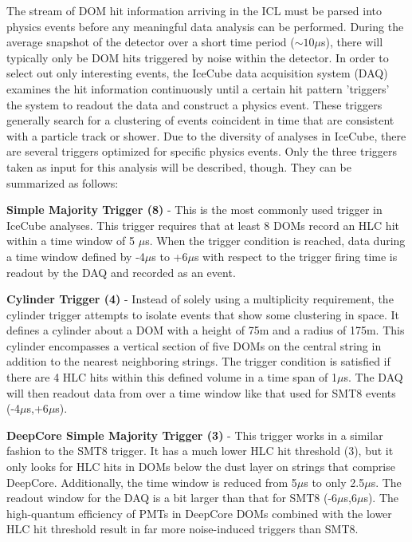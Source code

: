 \documentclass{gatech-thesis}
\begin{document}
The stream of DOM hit information arriving in the ICL must be parsed into physics events before any meaningful data analysis can be performed. During the average snapshot of the detector over a short time period ($\sim 10 \mu$s), there will typically only be DOM hits triggered by noise within the detector. In order to select out only interesting events, the IceCube data acquisition system (DAQ) examines the hit information continuously until a certain hit pattern 'triggers' the system to readout the data and construct a physics event. These triggers generally search for a clustering of events coincident in time that are consistent with a particle track or shower. Due to the diversity of analyses in IceCube, there are several triggers optimized for specific physics events. Only the three triggers taken as input for this analysis will be described, though. They can be summarized as follows:

\begin{adjustwidth}{2.5em}{2.5em}
\setlength{\parindent}{0pt}
\textbf{Simple Majority Trigger (8)} - This is the most commonly used trigger in IceCube analyses. This trigger requires that at least 8 DOMs record an HLC hit within a time window of 5 $\mu$s. When the trigger condition is reached, data during a time window defined by -4$\mu$s to +6$\mu$s with respect to the trigger firing time is readout by the DAQ and recorded as an event.

\textbf{Cylinder Trigger (4)} - Instead of solely using a multiplicity requirement, the cylinder trigger attempts to isolate events that show some clustering in space. It defines a cylinder about a DOM with a height of 75m and a radius of 175m. This cylinder encompasses a vertical section of five DOMs on the central string in addition to the nearest neighboring strings. The trigger condition is satisfied if there are 4 HLC hits within this defined volume in a time span of 1$\mu$s. The DAQ will then readout data from over a time window like that used for SMT8 events (-4$\mu$s,+6$\mu$s).

\textbf{DeepCore Simple Majority Trigger (3)} - This trigger works in a similar fashion to the SMT8 trigger. It has a much lower HLC hit threshold (3), but it only looks for HLC hits in DOMs below the dust layer on strings that comprise DeepCore. Additionally, the time window is reduced from 5$\mu$s to only 2.5$\mu$s. The readout window for the DAQ is a bit larger than that for SMT8 (-6$\mu$s,6$\mu$s). The high-quantum efficiency of PMTs in DeepCore DOMs combined with the lower HLC hit threshold result in far more noise-induced triggers than SMT8.
\end{adjustwidth}
\setlength{\parindent}{17.5pt}
\end{document}
